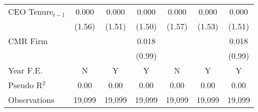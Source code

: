 {\begin{tabular}{l*{6}{c}}
CEO Tenure$ _{t-1} $&    0.000         &    0.000         &    0.000         &    0.000         &    0.000         &    0.000         \\
          &   (1.56)         &   (1.51)         &   (1.50)         &   (1.57)         &   (1.53)         &   (1.51)         \\
CMR Firm  &                  &                  &    0.018         &                  &                  &    0.018         \\
          &                  &                  &   (0.99)         &                  &                  &   (0.99)         \\
\midrule Year F.E. &        N         &        Y         &        Y         &        N         &        Y         &        Y         \\

Pseudo R$ ^2$&     0.00         &     0.00         &     0.00         &     0.00         &     0.00         &     0.00         \\
Observations&   19,099         &   19,099         &   19,099         &   19,099         &   19,099         &   19,099         \\
\bottomrule
\end{tabular}
}
